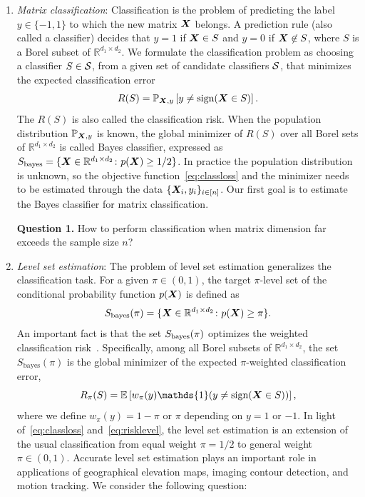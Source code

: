 \documentclass[11pt]{article}
\theoremstyle{definition}
\def\sign{\textup{sign}}
\def\bayesS{S_{\textup{bayes}}}
\begin{document}
\begin{enumerate}[label={2.\arabic*},wide, labelwidth=!, labelindent=0pt]
\item {\it Matrix classification}: Classification is the problem of predicting the label $y\in \{-1,1\}$ to which the new matrix $\bm X$ belongs. A prediction rule (also called a classifier) decides that $y=1$ if $\bm X\in S$ and $y=0$ if $\bm X \not\in S$, where $S$ is a Borel subset of $\mathbb{R}^{d_1\times d_2}$. We formulate the classification problem as choosing a classifier $S\in \mathcal{S}$, from a given set of candidate classifiers $\mathcal{S}$, that minimizes the expected classification error 
\begin{equation}\label{eq:classloss}
R(S)=\mathbb{P}_{\mX,y}\left[y\neq \sign(\mX\in S)\right].
\end{equation}
The $R(S)$ is also called the classification risk. When the population distribution $\mathbb{P}_{\bm X,y}$ is known, the global minimizer of $R(S)$ over all Borel sets of $\mathbb{R}^{d_1\times d_2}$ is called Bayes classifier, expressed as $\bayesS=\{\mX\in\mathbb{R}^{d_1\times d_2}\colon p(\mX)\geq 1/2\}$. In practice the population distribution is unknown, so the objective function~\eqref{eq:classloss} and the minimizer needs to be estimated through the data $\{\bm X_i,y_i\}_{i\in[n]}$. Our first goal is to estimate the Bayes classifier for matrix classification. 

{\bf Question 1.} How to perform classification when matrix dimension far exceeds the sample size $n$?

\item {\it Level set estimation}: The problem of level set estimation generalizes the classification task. For a given $\pi\in(0, 1)$, the target $\pi$-level set of the conditional probability function $p(\bm X)$ is defined as
\begin{equation}\label{eq:level}
\bayesS(\pi) = \{\mX\in\mathbb{R}^{d_1\times d_2}\colon p(\mX)\geq \pi\}.
\end{equation}
An important fact is that the set $\bayesS(\pi)$ optimizes the weighted classification risk~\citep{scott2007regression,wang2008probability}. Specifically, among all Borel subsets of $\mathbb{R}^{d_1\times d_2}$, the set $S_{\text{bayes}}(\pi)$ is the global minimizer of the expected $\pi$-weighted classification error,
\begin{equation}\label{eq:risklevel}
R_\pi(S)=\mathbb{E}\left[ w_{\pi}(y)\mathds{1}(y\neq \sign(\mX\in S))\right],
\end{equation}
where we define $w_{\pi}(y)=1-\pi$ or $\pi$ depending on $y=1$ or $-1$. In light of~\eqref{eq:classloss} and~\eqref{eq:risklevel}, the level set estimation is an extension of the usual classification from equal weight $\pi=1/2$ to general weight $\pi \in(0,1)$. Accurate level set estimation plays an important role in applications of geographical elevation maps, imaging contour detection, and motion tracking. We consider the following question:


\end{enumerate}
\end{document}
